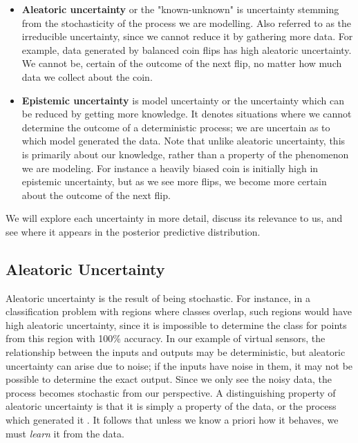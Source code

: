 \documentclass[../main.tex]{subfiles}
\begin{document}
\begin{itemize}
    \item \textbf{Aleatoric uncertainty} or the "known-unknown" is uncertainty stemming from the stochasticity of the process we are modelling. Also referred to as the irreducible uncertainty, since we cannot reduce it by gathering more data. For example, data generated by balanced coin flips has high aleatoric uncertainty. We cannot be, certain of the outcome of the next flip, no matter how much data we collect about the coin. 

    \item \textbf{Epistemic uncertainty} is model uncertainty or the uncertainty which can be reduced by getting more knowledge. It denotes situations where we cannot determine the outcome of a deterministic process; we are uncertain as to which model generated the data. 
    Note that unlike aleatoric uncertainty, this is primarily about our knowledge, rather than a property of the phenomenon we are modeling. For instance a heavily biased coin is initially high in epistemic uncertainty, but as we see more flips, we become more certain about the outcome of the next flip.
\end{itemize}

We will explore each uncertainty in more detail, discuss its relevance to us, and see where it appears in the posterior predictive distribution. 



\subsection{Aleatoric Uncertainty}
\label{subsec:aleatoric}
Aleatoric uncertainty is the result of  being stochastic. For instance, in a classification problem with regions where classes overlap, such regions would have high aleatoric uncertainty, since it is impossible to determine the class for points from this region with 100\% accuracy. In our example of virtual sensors, the relationship between the inputs and outputs may be deterministic, but aleatoric uncertainty can arise due to noise; if the inputs have noise in them, it may not be possible to determine the exact output. Since we only see the noisy data, the process becomes stochastic from our perspective.
A distinguishing property of aleatoric uncertainty is that it is simply a property of the data, or the process which generated it . It follows that unless we know a priori how it behaves, we must \emph{learn} it from the data. 
\end{document}
